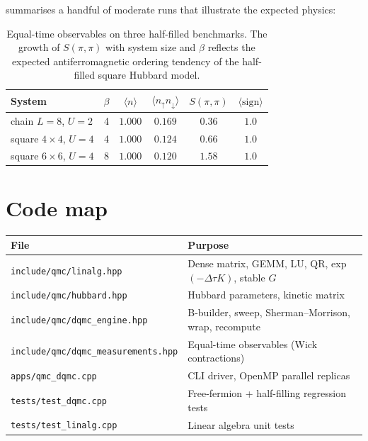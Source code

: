 \documentclass[11pt,a4paper]{article}
\newcommand{\dt}{\Delta\tau}
\theoremstyle{plain}
\begin{document}
 summarises a handful of moderate runs that
illustrate the expected physics:
\begin{table}[h!]
\centering
\begin{tabular}{lccccc}
\toprule
System & $\beta$ & $\langle n\rangle$ & $\langle n_\uparrow n_\downarrow\rangle$
       & $S(\pi,\pi)$ & $\langle\mathrm{sign}\rangle$\\
\midrule
chain $L=8$, $U=2$  & 4 & $1.000$ & $0.169$ & $0.36$  & $1.0$\\
square $4{\times}4$, $U=4$  & 4 & $1.000$ & $0.124$ & $0.66$  & $1.0$\\
square $6{\times}6$, $U=4$  & 8 & $1.000$ & $0.120$ & $1.58$  & $1.0$\\
\bottomrule
\end{tabular}
\caption{Equal-time observables on three half-filled benchmarks. The
growth of $S(\pi,\pi)$ with system size and $\beta$ reflects the
expected antiferromagnetic ordering tendency of the half-filled square
Hubbard model.}
\label{tab:dqmc-bench}
\end{table}

\section*{Code map}

\begin{table}[h!]
\centering
\small
\begin{tabular}{ll}
\toprule
File & Purpose\\
\midrule
\texttt{include/qmc/linalg.hpp}            & Dense matrix, GEMM, LU, QR, exp$(-\dt K)$, stable $G$\\
\texttt{include/qmc/hubbard.hpp}           & Hubbard parameters, kinetic matrix\\
\texttt{include/qmc/dqmc\_engine.hpp}      & B-builder, sweep, Sherman--Morrison, wrap, recompute\\
\texttt{include/qmc/dqmc\_measurements.hpp}& Equal-time observables (Wick contractions)\\
\texttt{apps/qmc\_dqmc.cpp}                & CLI driver, OpenMP parallel replicas\\
\texttt{tests/test\_dqmc.cpp}              & Free-fermion + half-filling regression tests\\
\texttt{tests/test\_linalg.cpp}            & Linear algebra unit tests\\
\bottomrule
\end{tabular}
\end{table}
\end{document}
